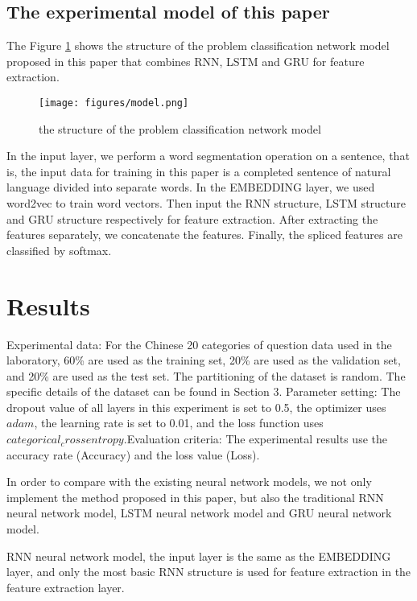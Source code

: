 \documentclass{article}
\begin{document}
\subsection{The experimental model of this paper}
The Figure \ref{fig:1} shows the structure of the problem classification network model proposed in this paper that combines RNN, LSTM and GRU for feature extraction.

\begin{figure}[h!]
    \centering
    \texttt{[image: figures/model.png]}
    \caption{the structure of the problem classification network model}
    \label{fig:1}
\end{figure}


In the input layer, we perform a word segmentation operation on a sentence, that is, the input data for training in this paper is a completed sentence of natural language divided into separate words. In the EMBEDDING layer, we used word2vec \cite{mikolov2013distributed} to train word vectors. Then input the RNN structure, LSTM structure and GRU structure respectively for feature extraction. After extracting the features separately, we concatenate the features. Finally, the spliced features are classified by softmax.

\section{Results}
Experimental data: For the Chinese 20 categories of question data used in the laboratory, 60\% are used as the training set, 20\% are used as the validation set, and 20\% are used as the test set. The partitioning of the dataset is random. The specific details of the dataset can be found in Section 3. Parameter setting: The dropout value of all layers in this experiment is set to 0.5, the optimizer uses $adam$, the learning rate is set to 0.01, and the loss function uses $categorical_crossentropy$.Evaluation criteria: The experimental results use the accuracy rate (Accuracy) and the loss value (Loss).

In order to compare with the existing neural network models, we not only implement the method proposed in this paper, but also the traditional RNN neural network model, LSTM neural network model and GRU neural network model.

RNN neural network model, the input layer is the same as the EMBEDDING layer, and only the most basic RNN structure is used for feature extraction in the feature extraction layer.
\end{document}
